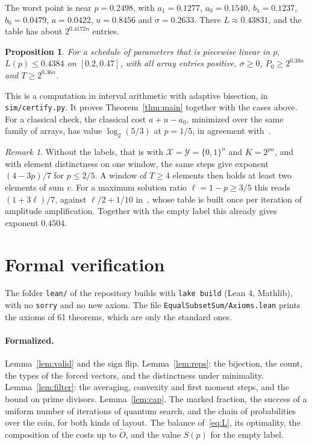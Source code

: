 \documentclass[11pt]{article}
\newtheorem{proposition}[theorem]{Proposition}
\theoremstyle{remark}
\newtheorem{remark}[theorem]{Remark}
\newcommand{\Ot}{\tilde O}
\newcommand{\Xs}{\mathcal X}
\newcommand{\Ys}{\mathcal Y}
\begin{document}
The worst point is near $p=0.2498$, with $a_1=0.1277$, $a_0=0.1540$, $b_1=0.1237$, $b_0=0.0479$, $a=0.0422$, $u=0.8456$ and $\sigma=0.2633$. There $L\approx0.43831$, and the table has about $2^{0.4172n}$ entries.

\begin{proposition}\label{prop:exponent}
For a schedule of parameters that is piecewise linear in $p$, $L(p)\le0.4384$ on $[0.2,0.47]$, with all array entries positive, $\sigma\ge0$, $P_0\ge2^{0.38n}$ and $T\ge2^{0.36n}$.
\end{proposition}

This is a computation in interval arithmetic with adaptive bisection, in \texttt{sim/certify.py}. It proves Theorem~\ref{thm:main} together with the cases above. For a classical check, the classical cost $a+u-a_0$, minimized over the same family of arrays, has value $\log_2(5/3)$ at $p=1/5$, in agreement with~\cite{Ye26}.

\begin{remark}
Without the labels, that is with $\Xs=\Ys=\{0,1\}^n$ and $K=2^{pn}$, and with element distinctness on one window, the same steps give exponent $(4-3p)/7$ for $p\le2/5$. A window of $T\ge4$ elements then holds at least two elements of sum $v$. For a maximum solution ratio $\ell=1-p\ge3/5$ this reads $(1+3\ell)/7$, against $\ell/2+1/10$ in~\cite[Theorem 5.5]{AHJKS22}, whose table is built once per iteration of amplitude amplification. Together with the empty label this already gives exponent $0.4504$.
\end{remark}

\section{Formal verification}\label{sec:lean}

The folder \texttt{lean/} of the repository builds with \texttt{lake build} (Lean 4, Mathlib), with no \texttt{sorry} and no new axiom. The file \texttt{EqualSubsetSum/Axioms.lean} prints the axioms of 61 theorems, which are only the standard ones.

\paragraph{Formalized.} Lemma~\ref{lem:valid} and the sign flip. Lemma~\ref{lem:reps}: the bijection, the count, the types of the forced vectors, and the distinctness under minimality. Lemma~\ref{lem:filter}: the averaging, convexity and first moment steps, and the bound on prime divisors. Lemma~\ref{lem:cap}. The marked fraction, the success of a uniform number of iterations of quantum search, and the chain of probabilities over the coin, for both kinds of layout. The balance of~\eqref{eq:L}, its optimality, the composition of the costs up to $\Ot$, and the value $S(p)$ for the empty label.
\end{document}
